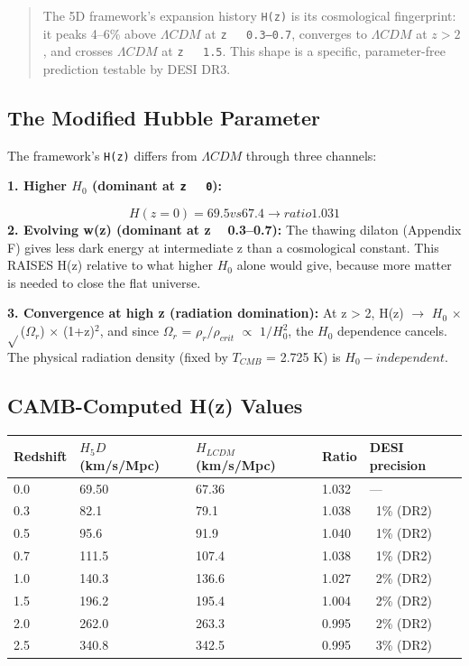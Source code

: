\documentclass[aps,prd,preprint,superscriptaddress,longbibliography]{revtex4-2}
\begin{document}
\begin{quote}
The 5D framework's expansion history \texttt{H(z)} is its cosmological
fingerprint: it peaks 4--6\% above $\Lambda CDM$ at \texttt{z ~ 0.3--0.7}, converges
to $\Lambda CDM$ at $z > 2$, and crosses $\Lambda CDM$ at \texttt{z ~ 1.5}. This shape is
a specific, parameter-free prediction testable by DESI DR3.
\end{quote}



\subsection{The Modified Hubble Parameter}

The framework's \texttt{H(z)} differs from $\Lambda CDM$ through three channels:

\textbf{1. Higher $H_{0}$ (dominant at \texttt{z ~ 0}):}

\begin{equation}
    H(z=0) = 69.5 vs 67.4 \to ratio 1.031
\end{equation}
\textbf{2. Evolving w(z) (dominant at z ~ 0.3--0.7):} The thawing dilaton (Appendix F) gives less dark energy at intermediate z than a cosmological constant. This RAISES H(z) relative to what higher $H_{0}$ alone would give, because more matter is needed to close the flat universe.

\textbf{3. Convergence at high z (radiation domination):} At z > 2, H(z) $\to$ $H_{0}$ $\times$ $\sqrt{}$($\Omega_r$) $\times$ (1+z)$^{2}$, and since $\Omega_r$ = $\rho_r/\rho_{crit}$ $\propto$ $1/H_{0}^{2}$, the $H_{0}$ dependence cancels. The physical radiation density (fixed by $T_{CMB}$ = 2.725 K) is $H_{0}-independent$.



\subsection{CAMB-Computed H(z) Values}


\begin{table}[H]
\begin{ruledtabular}
\begin{tabular}{p{3.0cm}p{3.0cm}p{3.0cm}p{3.0cm}p{3.0cm}}
Redshift & $H_5D$ (km/s/Mpc) & $H_{LCDM}$ (km/s/Mpc) & Ratio & DESI precision \\
\hline
0.0 & 69.50 & 67.36 & 1.032 & --- \\
0.3 & 82.1 & 79.1 & 1.038 & ~1\% (DR2) \\
0.5 & 95.6 & 91.9 & 1.040 & ~1\% (DR2) \\
0.7 & 111.5 & 107.4 & 1.038 & ~1\% (DR2) \\
1.0 & 140.3 & 136.6 & 1.027 & ~2\% (DR2) \\
1.5 & 196.2 & 195.4 & 1.004 & ~2\% (DR2) \\
2.0 & 262.0 & 263.3 & 0.995 & ~2\% (DR2) \\
2.5 & 340.8 & 342.5 & 0.995 & ~3\% (DR2) \\
\end{tabular}
\end{ruledtabular}
\end{table}
\end{document}
